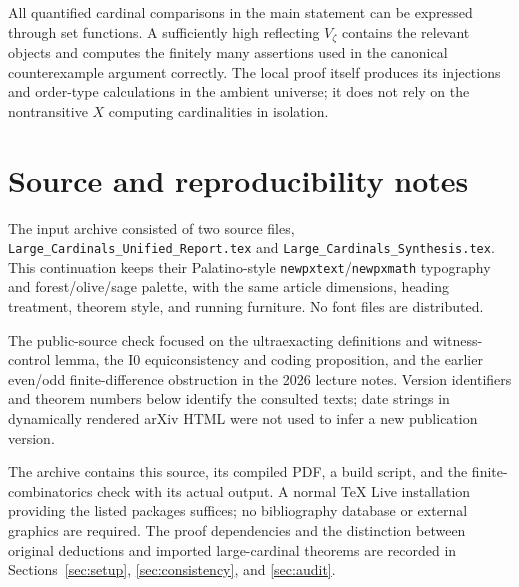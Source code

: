 \documentclass[11pt,letterpaper]{article}
\theoremstyle{definition}
\newcommand{\Izero}{\mathrm{I0}}
\numberwithin{equation}{section}
\begin{document}
All quantified cardinal comparisons in the main statement can be expressed through set functions. A sufficiently high reflecting $V_\zeta$ contains the relevant objects and computes the finitely many assertions used in the canonical counterexample argument correctly. The local proof itself produces its injections and order-type calculations in the ambient universe; it does not rely on the nontransitive $X$ computing cardinalities in isolation.

\section{Source and reproducibility notes}\label{app:sources}

The input archive consisted of two source files, \texttt{Large\_Cardinals\_Unified\_Report.tex} and \texttt{Large\_Cardinals\_Synthesis.tex}. This continuation keeps their Palatino-style \texttt{newpxtext}/\texttt{newpxmath} typography and forest/olive/sage palette, with the same article dimensions, heading treatment, theorem style, and running furniture. No font files are distributed.

The public-source check focused on the ultraexacting definitions and witness-control lemma, the $\Izero$ equiconsistency and coding proposition, and the earlier even/odd finite-difference obstruction in the 2026 lecture notes. Version identifiers and theorem numbers below identify the consulted texts; date strings in dynamically rendered arXiv HTML were not used to infer a new publication version.

The archive contains this source, its compiled PDF, a build script, and the finite-combinatorics check with its actual output. A normal TeX Live installation providing the listed packages suffices; no bibliography database or external graphics are required. The proof dependencies and the distinction between original deductions and imported large-cardinal theorems are recorded in Sections~\ref{sec:setup}, \ref{sec:consistency}, and \ref{sec:audit}.
\end{document}
